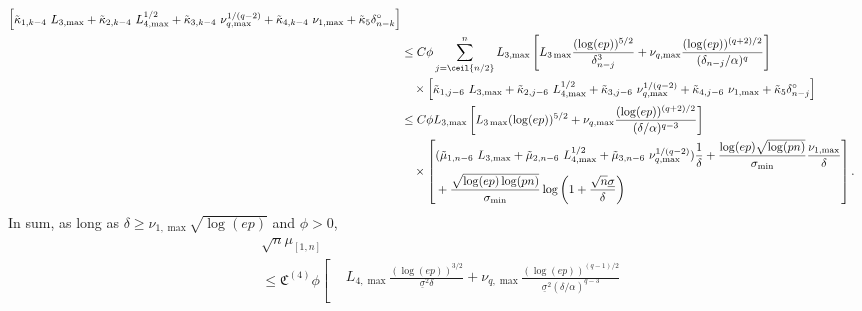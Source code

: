 \documentclass[aos]{imsart}
\begin{document}
\begin{appendix}
\begin{equation*}
\begin{aligned}
    \left[ \begin{aligned}
        & \tilde\kappa_{1,k-4} ~{L}_{3,\max}
        + \tilde\kappa_{2,k-4} ~{L}_{4,\max}^{1/2}
        + \tilde\kappa_{3,k-4} ~\nu_{q,\max}^{1/(q-2)}
        + \tilde\kappa_{4,k-4} ~\nu_{1,\max}
        + \tilde\kappa_{5} \delta_{n-k}^\circ \\
    \end{aligned} \right]  
    \\
    & \leq C \phi \sum_{j=\ceil{n/2}}^{n} L_{3,\max} \left[ 
        L_{3\max} \frac{(\log(ep))^{5/2}}{\delta_{n-j}^3}
        + \nu_{q,\max} \frac{(\log(ep))^{(q+2)/2}}{(\delta_{n-j}/\alpha)^{q}}
    \right] \\
    & \quad \times 
    \left[ \begin{aligned}
        & \tilde\kappa_{1,j-6} ~{L}_{3,\max}
        + \tilde\kappa_{2,j-6} ~{L}_{4,\max}^{1/2}
        + \tilde\kappa_{3,j-6} ~\nu_{q,\max}^{1/(q-2)}
        + \tilde\kappa_{4,j-6} ~\nu_{1,\max}
        + \tilde\kappa_{5} \delta_{n-j}^\circ \\
    \end{aligned} \right]  
    \\
    & \leq C \phi L_{3,\max} \left[ 
        L_{3\max} (\log(ep))^{5/2}
        + \nu_{q,\max} \frac{(\log(ep))^{(q+2)/2}}{(\delta/\alpha)^{q-3}}
    \right] \\
    & \quad \times \left[ \begin{aligned}
        & (\tilde\mu_{1,n-6} ~{L}_{3,\max} 
         +\tilde\mu_{2,n-6} ~{L}_{4,\max}^{1/2}
         +\tilde\mu_{3,n-6} ~\nu_{q,\max}^{1/(q-2)})
        \frac{1}{\delta} 
        +\frac{\log(ep)\sqrt{\log(pn)}}{\sigma_{\min}} \frac{\nu_{1,\max}}{\delta} \\
        & + \frac{\sqrt{\log(ep)\log(pn)}}{\sigma_{\min}} 
        \log\left(1 + \frac{\sqrt{n}\underline{\sigma}}{\delta}\right)
    \end{aligned} \right].
    \\
\end{aligned}
\end{equation*}
In sum, as long as $\delta \geq \nu_{1,\max} \sqrt{\log(ep)}$ and $\phi > 0$,
\begin{equation*}
\begin{aligned}
    & \sqrt{n} \mu_{[1,n]} \\
    & \leq \mathfrak{C}^{(4)} \phi \left[ \begin{aligned} 
        & {L}_{4,\max} \frac{(\log(ep))^{3/2}}{\underline{\sigma}^2 \delta} 
        + \nu_{q,\max} \frac{(\log(ep))^{(q-1)/2}}{\underline\sigma^2 (\delta/\alpha)^{q-3}} \\

\end{aligned}
\end{aligned}
\end{equation*}
\end{appendix}
\end{document}
